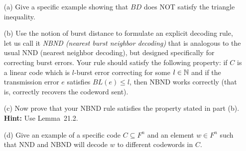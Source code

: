 \documentclass[12pt]{amsart}
\begin{document}
\begin{itemize}
\item[(a)] Give a specific example showing that $BD$ does NOT satisfy the triangle inequality.
\item[(b)] Use the notion of burst distance to formulate an explicit decoding rule, let us call it {\it NBND (nearest burst neighbor decoding)} that is analogous to the usual NND (nearest neighbor decoding), but designed specifically for correcting burst errors. Your rule should satisfy the following property: if $C$ is a linear code which is $l$-burst error correcting for some $l\in{\mathbb N}$ and if the transmission error $e$ satisfies
$BL(e)\leq l$, then NBND works correctly (that is, correctly recovers the codeword sent).
\item[(c)] Now prove that your NBND rule satisfies the property stated in part (b). {\bf Hint:} Use Lemma~21.2.
\item[(d)] Give an example of a specific code $C\subseteq F^n$ and an element $w\in F^n$ such that NND and NBND will decode $w$
to different codewords in $C$.
\end{itemize}
\end{document}
